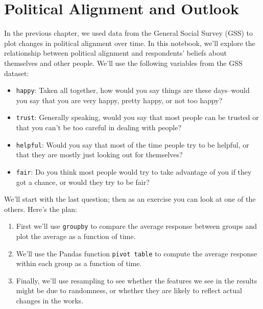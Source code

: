 \hypertarget{political-alignment-and-outlook}{%
\chapter{Political Alignment and
Outlook}\label{political-alignment-and-outlook}}

In the previous chapter, we used data from the General Social Survey
(GSS) to plot changes in political alignment over time. In this
notebook, we'll explore the relationship between political alignment and
respondents' beliefs about themselves and other people. We'll use the
following variables from the GSS dataset:

\begin{itemize}
\item
  \passthrough{\lstinline!happy!}: Taken all together, how would you say
  things are these days--would you say that you are very happy, pretty
  happy, or not too happy?
\item
  \passthrough{\lstinline!trust!}: Generally speaking, would you say
  that most people can be trusted or that you can't be too careful in
  dealing with people?
\item
  \passthrough{\lstinline!helpful!}: Would you say that most of the time
  people try to be helpful, or that they are mostly just looking out for
  themselves?
\item
  \passthrough{\lstinline!fair!}: Do you think most people would try to
  take advantage of you if they got a chance, or would they try to be
  fair?
\end{itemize}

We'll start with the last question; then as an exercise you can look at
one of the others. Here's the plan:

\begin{enumerate}
\def\labelenumi{\arabic{enumi}.}
\item
  First we'll use \passthrough{\lstinline!groupby!} to compare the
  average response between groups and plot the average as a function of
  time.
\item
  We'll use the Pandas function \passthrough{\lstinline!pivot table!} to
  compute the average response within each group as a function of time.
\item
  Finally, we'll use resampling to see whether the features we see in
  the results might be due to randomness, or whether they are likely to
  reflect actual changes in the works.
\end{enumerate}


